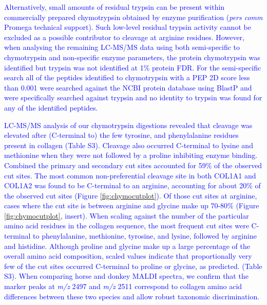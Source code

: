 \documentclass[preprint, 3p, authoryear]{elsarticle} %
\begin{document}
\textcolor{blue}{Alternatively, small amounts of residual trypsin can be present within commercially prepared chymotrypsin obtained by enzyme purification (\emph{pers comm} Promega technical support). Such low-level residual trypsin activity cannot be excluded as a possible contributor to cleavage at arginine residues. However, when analysing the remaining LC-MS/MS data using both semi-specific to chymotrypsin and non-specific enzyme parameters, the protein chymotrypsin was identified but trypsin was not identified at 1\% protein FDR. For the semi-specific search all of the peptides identified to chymotrypsin with a PEP 2D score less than 0.001 were searched against the NCBI protein database using BlastP and were specifically searched against trypsin and no identity to trypsin was found for any of the identified peptides.}

\textcolor{blue}{LC-MS/MS analysis of our chymotrypsin digestions revealed that cleavage was elevated after (C-terminal to) the few tyrosine, and phenylalanine residues present in collagen (Table S3). Cleavage also occurred C-terminal to lysine and methionine when they were not followed by a proline inhibiting enzyme binding. Combined the primary and secondary cut sites accounted for 59\% of the observed cut sites. The most common non-preferential cleavage site in both COL1A1 and COL1A2 was found to be C-terminal to an arginine, accounting for about 20\% of the observed cut sites (Figure \ref{fig:chymocutplot}). Of those cut sites at arginine, cases where the cut site is between arginine and glycine make up 70-80\% (Figure \ref{fig:chymocutplot}, insert). When scaling against the number of the particular amino acid residues in the collagen sequence, the most frequent cut sites were C-terminal to phenylalanine, methionine, tyrosine, and lysine, followed by arginine and histidine. Although proline and glycine make up a large percentage of the overall amino acid composition, scaled values indicate that proportionally very few of the cut sites occurred C-terminal to proline or glycine, as predicted. (Table S3). When comparing horse and donkey MALDI spectra, we confirm that the marker peaks at \emph{m/z} 2497 and \emph{m/z} 2511 correspond to collagen amino acid differences between these two species and allow robust taxonomic discrimination.}
\end{document}
